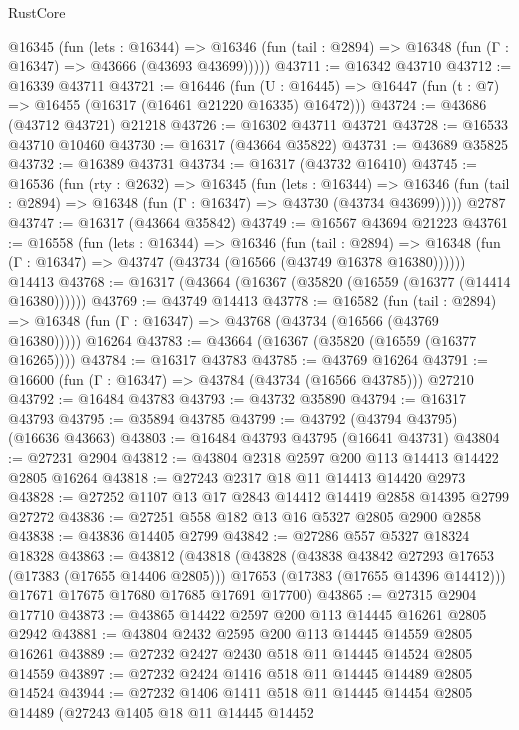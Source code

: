 \begin{lexlean}{RustCore}
\begin{coremodule}
    @16345
      (fun (lets : @16344) =>
      @16346 (fun (tail : @2894) => @16348 (fun (Γ : @16347) => @43666 (@43693 @43699)))))
@43711 := @16342 @43710
@43712 := @16339 @43711
@43721 := @16446
    (fun (U : @16445) => @16447 (fun (t : @7) => @16455 (@16317 (@16461 @21220 @16335) @16472)))
@43724 := @43686 (@43712 @43721) @21218
@43726 := @16302 @43711 @43721
@43728 := @16533 @43710 @10460
@43730 := @16317 (@43664 @35822)
@43731 := @43689 @35825
@43732 := @16389 @43731
@43734 := @16317 (@43732 @16410)
@43745 := @16536
    (fun (rty : @2632) =>
    @16345
      (fun (lets : @16344) =>
      @16346 (fun (tail : @2894) => @16348 (fun (Γ : @16347) => @43730 (@43734 @43699)))))
    @2787
@43747 := @16317 (@43664 @35842)
@43749 := @16567 @43694 @21223
@43761 := @16558
    (fun (lets : @16344) =>
    @16346
      (fun (tail : @2894) =>
      @16348 (fun (Γ : @16347) => @43747 (@43734 (@16566 (@43749 @16378 @16380))))))
    @14413
@43768 := @16317 (@43664 (@16367 (@35820 (@16559 (@16377 (@14414 @16380))))))
@43769 := @43749 @14413
@43778 := @16582
    (fun (tail : @2894) => @16348 (fun (Γ : @16347) => @43768 (@43734 (@16566 (@43769 @16380)))))
    @16264
@43783 := @43664 (@16367 (@35820 (@16559 (@16377 @16265))))
@43784 := @16317 @43783
@43785 := @43769 @16264
@43791 := @16600 (fun (Γ : @16347) => @43784 (@43734 (@16566 @43785))) @27210
@43792 := @16484 @43783
@43793 := @43732 @35890
@43794 := @16317 @43793
@43795 := @35894 @43785
@43799 := @43792 (@43794 @43795) (@16636 @43663)
@43803 := @16484 @43793 @43795 (@16641 @43731)
@43804 := @27231 @2904
@43812 := @43804 @2318 @2597 @200 @113 @14413 @14422 @2805 @16264
@43818 := @27243 @2317 @18 @11 @14413 @14420 @2973
@43828 := @27252 @1107 @13 @17 @2843 @14412 @14419 @2858 @14395 @2799 @27272
@43836 := @27251 @558 @182 @13 @16 @5327 @2805 @2900 @2858
@43838 := @43836 @14405 @2799
@43842 := @27286 @557 @5327 @18324 @18328
@43863 := @43812
    (@43818
      (@43828
        (@43838 @43842 @27293 @17653 (@17383 (@17655 @14406 @2805)))
        @17653
        (@17383 (@17655 @14396 @14412)))
      @17671
      @17675
      @17680
      @17685
      @17691
      @17700)
@43865 := @27315 @2904 @17710
@43873 := @43865 @14422 @2597 @200 @113 @14445 @16261 @2805 @2942
@43881 := @43804 @2432 @2595 @200 @113 @14445 @14559 @2805 @16261
@43889 := @27232 @2427 @2430 @518 @11 @14445 @14524 @2805 @14559
@43897 := @27232 @2424 @1416 @518 @11 @14445 @14489 @2805 @14524
@43944 := @27232
    @1406
    @1411
    @518
    @11
    @14445
    @14454
    @2805
    @14489
    (@27243
      @1405
      @18
      @11
      @14445
      @14452

\end{coremodule}
\end{lexlean}
